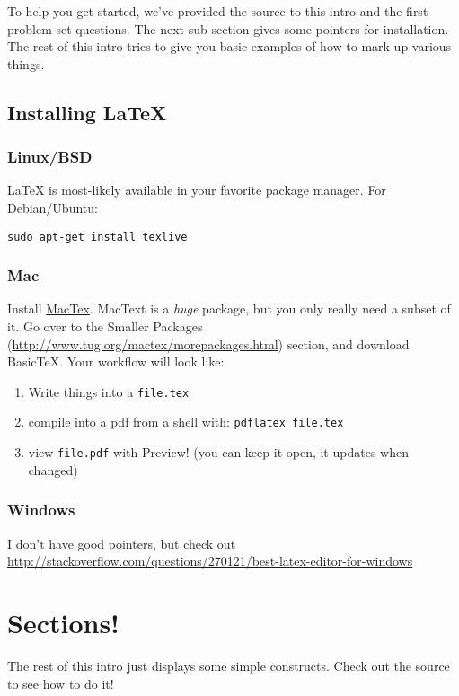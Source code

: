 \documentclass[12pt]{article}
\begin{document}
  To help you get started, we've provided the source to this intro and the first
  problem set questions. The next sub-section gives some pointers for
  installation. The rest of this intro tries to give you basic examples of how
  to mark up various things.

  \subsection{Installing \LaTeX}

  \subsubsection{Linux/BSD}

    \LaTeX \; is most-likely available in your favorite package manager. For
    Debian/Ubuntu:
    \begin{center}
      \texttt{sudo apt-get install texlive}
    \end{center}

  \subsubsection{Mac}

    Install \href{http://www.tug.org/mactex/}{MacTex}.
    MacText is a \emph{huge} package, but you only really need a subset of it.
    Go over to the Smaller Packages
    (\url{http://www.tug.org/mactex/morepackages.html}) section, and download
    BasicTeX. Your workflow will look like:
    \begin{enumerate}
      \item Write things into a \texttt{file.tex}
      \item compile into a pdf from a shell with: \texttt{pdflatex file.tex}
      \item view \texttt{file.pdf} with Preview! (you can keep it open, it
            updates when changed)
    \end{enumerate}

  \subsubsection{Windows}

  I don't have good pointers, but check out \url{http://stackoverflow.com/questions/270121/best-latex-editor-for-windows}

  \newpage

  \section{Sections!}
  The rest of this intro just displays some simple constructs. Check out the
  source to see how to do it!
\end{document}
